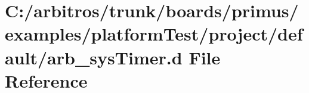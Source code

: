 \hypertarget{boards_2primus_2examples_2platform_test_2project_2default_2arb__sys_timer_8d}{\section{C\-:/arbitros/trunk/boards/primus/examples/platform\-Test/project/default/arb\-\_\-sys\-Timer.d File Reference}
\label{boards_2primus_2examples_2platform_test_2project_2default_2arb__sys_timer_8d}
}
